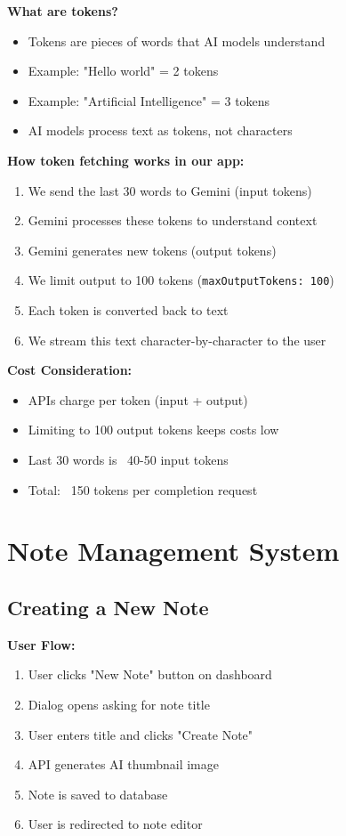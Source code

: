 \documentclass[11pt,a4paper]{article}
\begin{document}
\textbf{What are tokens?}
\begin{itemize}
    \item Tokens are pieces of words that AI models understand
    \item Example: "Hello world" = 2 tokens
    \item Example: "Artificial Intelligence" = 3 tokens
    \item AI models process text as tokens, not characters
\end{itemize}

\textbf{How token fetching works in our app:}
\begin{enumerate}
    \item We send the last 30 words to Gemini (input tokens)
    \item Gemini processes these tokens to understand context
    \item Gemini generates new tokens (output tokens)
    \item We limit output to 100 tokens (\texttt{maxOutputTokens: 100})
    \item Each token is converted back to text
    \item We stream this text character-by-character to the user
\end{enumerate}

\textbf{Cost Consideration:}
\begin{itemize}
    \item APIs charge per token (input + output)
    \item Limiting to 100 output tokens keeps costs low
    \item Last 30 words is ~40-50 input tokens
    \item Total: ~150 tokens per completion request
\end{itemize}


\section{Note Management System}

\subsection{Creating a New Note}

\textbf{User Flow:}
\begin{enumerate}
    \item User clicks "New Note" button on dashboard
    \item Dialog opens asking for note title
    \item User enters title and clicks "Create Note"
    \item API generates AI thumbnail image
    \item Note is saved to database
    \item User is redirected to note editor
\end{enumerate}
\end{document}
